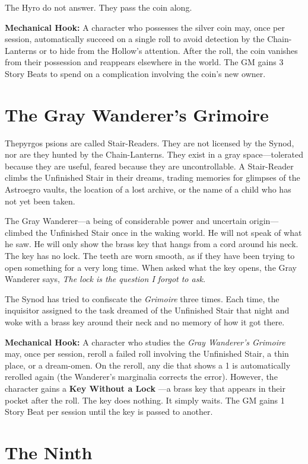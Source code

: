 \documentclass[10pt,twocolumn]{book}
\begin{document}
The Hyro do not answer. They pass the coin along.

\textbf{Mechanical Hook:} A character who possesses the silver coin may, once per session, automatically succeed on a single roll to avoid detection by the Chain-Lanterns or to hide from the Hollow's attention. After the roll, the coin vanishes from their possession and reappears elsewhere in the world. The GM gains 3 Story Beats to spend on a complication involving the coin's new owner.

\section{The Gray Wanderer's Grimoire}

Thepyrgos psions are called Stair-Readers. They are not licensed by the Synod, nor are they hunted by the Chain-Lanterns. They exist in a gray space---tolerated because they are useful, feared because they are uncontrollable. A Stair-Reader climbs the Unfinished Stair in their dreams, trading memories for glimpses of the Astroegro vaults, the location of a lost archive, or the name of a child who has not yet been taken.

The Gray Wanderer---a being of considerable power and uncertain origin---climbed the Unfinished Stair once in the waking world. He will not speak of what he saw. He will only show the brass key that hangs from a cord around his neck. The key has no lock. The teeth are worn smooth, as if they have been trying to open something for a very long time. When asked what the key opens, the Gray Wanderer says, \textit{The lock is the question I forgot to ask.}

The Synod has tried to confiscate the \textit{Grimoire} three times. Each time, the inquisitor assigned to the task dreamed of the Unfinished Stair that night and woke with a brass key around their neck and no memory of how it got there.

\textbf{Mechanical Hook:} A character who studies the \textit{Gray Wanderer's Grimoire} may, once per session, reroll a failed roll involving the Unfinished Stair, a thin place, or a dream-omen. On the reroll, any die that shows a 1 is automatically rerolled again (the Wanderer's marginalia corrects the error). However, the character gains a \textbf{Key Without a Lock} ---a brass key that appears in their pocket after the roll. The key does nothing. It simply waits. The GM gains 1 Story Beat per session until the key is passed to another.

\section{The Ninth}
\end{document}
